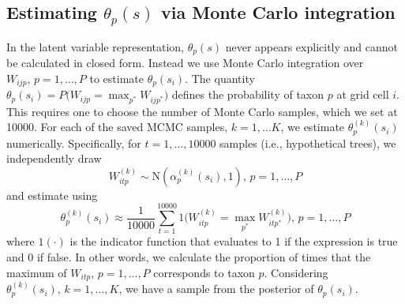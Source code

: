 \documentclass[12pt]{article}\usepackage[]{graphicx}\usepackage[]{color}
\begin{document}
\subsection{Estimating $\theta_{p}(s)$ via Monte Carlo integration}

In the latent variable representation, $\theta_{p}(s)$ never appears
explicitly and cannot be calculated in closed form. Instead we use
Monte Carlo integration over $W_{ijp},\, p=1,\ldots,P$ to estimate
$\theta_{p}(s_{i})$. The quantity $\theta_{p}(s_{i})=P(W_{ijp}={\displaystyle \max_{p^{*}}W_{ijp^{*}})}$
defines the probability of taxon $p$ at grid cell $i$. This requires
one to choose the number of Monte Carlo samples, which we set at 10000.
For each of the saved MCMC samples, $k=1,\ldots K$, we estimate $\theta_{p}^{(k)}(s_{i})$
numerically. Specifically, for $t=1,\ldots,10000$ samples (i.e.,
hypothetical trees), we independently draw
\[
W_{itp}^{(k)}\sim\mbox{N}(\alpha_{p}^{(k)}(s_{i}),1),\, p=1,\ldots,P
\]
and estimate using 
\[
\theta_{p}^{(k)}(s_{i})\approx\frac{1}{10000}{\displaystyle \sum_{t=1}^{10000}1(W_{itp}^{(k)}={\displaystyle \max_{p^{*}}W_{itp^{*}}^{(k)})}},\, p=1,\ldots,P
\]
where $1(\cdot)$ is the indicator function that evaluates to 1 if
the expression is true and 0 if false. In other words, we calculate
the proportion of times that the maximum of $W_{itp},\, p=1,\ldots,P$
corresponds to taxon $p$. Considering $\theta_{p}^{(k)}(s_{i}),\, k=1,\ldots,K$,
we have a sample from the posterior of $\theta_{p}(s_{i})$.
\end{document}
